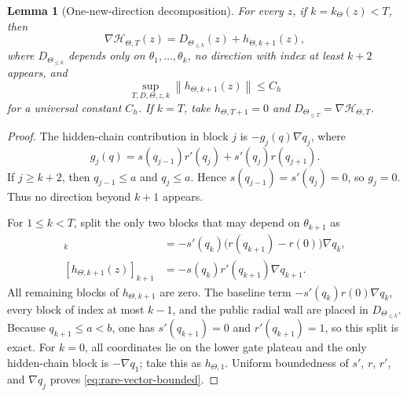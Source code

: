 \documentclass[11pt,a4paper]{article}
\newcommand{\norm}[1]{\left\lVert #1\right\rVert}
\newtheorem{lemma}[theorem]{Lemma}
\theoremstyle{remark}
\begin{document}
\begin{lemma}[One-new-direction decomposition]
\label{lem:one-new-direction-decomposition}
For every $z$, if $k=k_\Theta(z)<T$, then
\begin{equation}
 \nabla\mathcal H_{\Theta,T}(z)
 =D_{\Theta_{\le k}}(z)+h_{\Theta,k+1}(z),
 \label{eq:one-new-direction-base}
\end{equation}
where $D_{\Theta_{\le k}}$ depends only on
$\theta_1,\ldots,\theta_k$, no direction with index at least $k+2$ appears,
and
\begin{equation}
 \sup_{T,D,\Theta,z,k}\norm{h_{\Theta,k+1}(z)}\le C_h
 \label{eq:rare-vector-bounded}
\end{equation}
for a universal constant $C_h$.  If $k=T$, take
$h_{\Theta,T+1}=0$ and $D_{\Theta_{\le T}}=\nabla\mathcal H_{\Theta,T}$.
\end{lemma}

\begin{proof}
The hidden-chain contribution in block $j$ is
$-g_j(q)\nabla q_j$, where
\[
 g_j(q)=s(q_{j-1})r'(q_j)+s'(q_j)r(q_{j+1}).
\]
If $j\ge k+2$, then $q_{j-1}\le a$ and $q_j\le a$.  Hence
$s(q_{j-1})=s'(q_j)=0$, so $g_j=0$.  Thus no direction beyond $k+1$ appears.

For $1\le k<T$, split the only two blocks that may depend on
$\theta_{k+1}$ as
\begin{align}
 [h_{\Theta,k+1}(z)]_k
 &=-s'(q_k)\bigl(r(q_{k+1})-r(0)\bigr)\nabla q_k,
 \label{eq:rare-vector-prev-block}\\
 [h_{\Theta,k+1}(z)]_{k+1}
 &=-s(q_k)r'(q_{k+1})\nabla q_{k+1}.
 \label{eq:rare-vector-new-block}
\end{align}
All remaining blocks of $h_{\Theta,k+1}$ are zero.  The baseline term
$-s'(q_k)r(0)\nabla q_k$, every block of index at most $k-1$, and the public
radial wall are placed in $D_{\Theta_{\le k}}$.  Because
$q_{k+1}\le a<b$, one has $s'(q_{k+1})=0$ and $r'(q_{k+1})=1$, so this split
is exact.  For $k=0$, all coordinates lie on the lower gate plateau and the
only hidden-chain block is $-\nabla q_1$; take this as $h_{\Theta,1}$.
Uniform boundedness of $s'$, $r$, $r'$, and $\nabla q_j$ proves
\eqref{eq:rare-vector-bounded}.
\end{proof}
\end{document}
